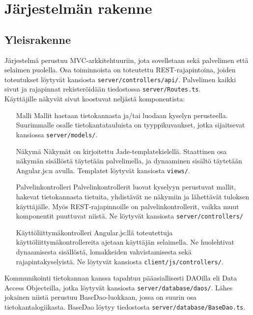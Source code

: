 \chapter{Järjestelmän rakenne}

\section{Yleisrakenne}

Järjestelmä perustuu MVC-arkkitehtuuriin, jota sovelletaan sekä palvelimen että selaimen puolella. Osa toiminnoista on toteutettu REST-rajapintoina, joiden toteutukset löytyvät kansiosta \texttt{server/controllers/api/}. Palvelimen kaikki sivut ja rajapinnat rekisteröidään tiedostossa \texttt{server/Routes.ts}.\\

\noindent
Käyttäjille näkyvät sivut koostuvat neljästä komponentista:

\begin{itemize}
	\item[Malli] Mallit haetaan tietokannasta ja/tai luodaan kyselyn perusteella. Suurimmalle osalle tietokantatauluista on tyyppikuvaukset, jotka sijaitsevat kansiossa \texttt{server/models/}.
	\item[Näkymä] Näkymät on kirjoitettu Jade-templatekielellä. Staattinen osa näkymän sisällöstä täytetään palvelimella, ja dynaaminen sisältö täytetään Angular.js:n avulla. Templatet löytyvät kansiosta \texttt{views/}.
	\item[Palvelinkontrolleri] Palvelinkontrollerit luovat kyselyyn perustuvat mallit, hakevat tietokannasta tietuita, yhdistävät ne näkymiin ja lähettävät tuloksen käyttäjälle. Myös REST-rajapinnoille on palvelinkontrollerit, vaikka muut komponentit puuttuvat niistä. Ne löytyvät kansiosta \texttt{server/controllers/}
	\item[Käyttöliittymäkontrolleri] Angular.js:llä toteutettuja käyttöliittymäkontrollereita ajetaan käyttäjän selaimella. Ne huolehtivat dynaamisesta sisällöstä, lomakkeiden vahvistamisesta sekä rajapintakyselyistä. Ne löytyvät kansiosta \texttt{client/js/controllers/}.
\end{itemize}

\noindent
Kommunikointi tietokannan kanssa tapahtuu pääasiallisesti DAOilla eli Data Access Objecteilla, jotka löytyvät kansiosta \texttt{server/database/daos/}. Lähes jokainen niistä perustuu BaseDao-luokkaan, jossa on suurin osa tietokantalogiikasta. BaseDao löytyy tiedostosta \texttt{server/database/BaseDao.ts}.

